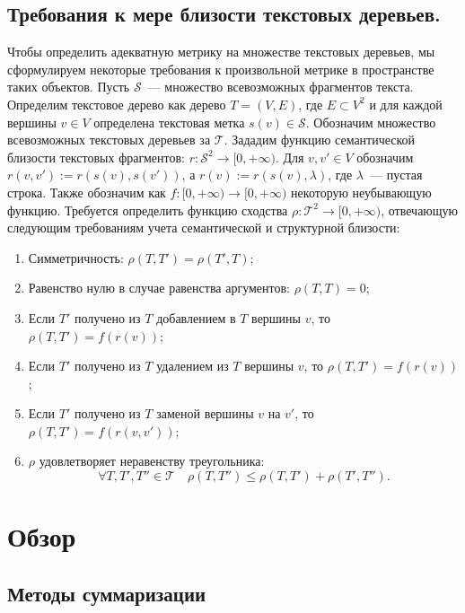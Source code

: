 \documentclass[12pt]{article}
\begin{document}
\subsection{Требования к мере близости текстовых деревьев.} \label{metric_requirements}
Чтобы определить адекватную метрику на множестве текстовых деревьев, мы сформулируем некоторые требования к произвольной метрике в пространстве таких объектов. Пусть $\mathcal{S}$~--- множество всевозможных фрагментов текста. Определим текстовое дерево как дерево $T = (V, E)$, где $E \subset V^2$ и для каждой вершины $v\in V$ определена текстовая метка $s(v)\in\mathcal{S}$. Обозначим множество всевозможных текстовых деревьев за $\mathcal{T}$. Зададим функцию семантической близости текстовых фрагментов: $r: \mathcal{S}^2 \rightarrow [0, +\infty)$. Для $v, v'\in V$ обозначим $r(v, v') := r(s(v), s(v'))$, а $r(v) := r(s(v), \lambda)$, где $\lambda$~--- пустая строка. Также обозначим как $f: [0,+\infty)\rightarrow[0,+\infty)$ некоторую неубывающую функцию. Требуется определить функцию сходства $\rho: \mathcal{T}^2 \rightarrow [0, +\infty)$, отвечающую следующим требованиям учета семантической и структурной близости:
\begin{enumerate}
    \item Симметричность: $\rho(T, T') = \rho(T', T)$;
    \item Равенство нулю в случае равенства аргументов: $\rho(T, T) = 0$;
    \item Если $T'$ получено из $T$ добавлением в $T$ вершины $v$, то $\rho(T, T') = f(r(v))$;
    \item Если $T'$ получено из $T$ удалением из $T$ вершины $v$, то $\rho(T, T') = f(r(v))$;
    \item Если $T'$ получено из $T$ заменой вершины $v$ на $v'$, то $\rho(T, T')= f(r(v, v'))$;
    \item $\rho$ удовлетворяет неравенству треугольника: 
    \begin{equation} \label{metric_requirement_6}
        \forall T, T', T''\in\mathcal{T}\quad \rho(T,T'')\leq\rho(T,T')+\rho(T',T'').
    \end{equation}
\end{enumerate}

\newpage
\section{Обзор}
\subsection{Методы суммаризации}
\end{document}
